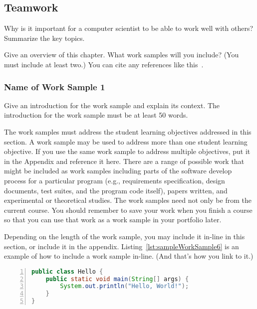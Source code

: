 \subsection{Teamwork}
Why is it important for a computer scientist to be able to work well with
others?  Summarize the key topics.

Give an overview of this chapter.  What work samples will you include?
(You must include at least two.)  You can cite any references like
this~\cite{parks:samsfsoal:2009}.

\subsubsection{Name of Work Sample 1}
Give an introduction for the work sample and explain its context.  The
introduction for the work sample must be at least 50 words.

The work samples must address the student learning objectives addressed in
this section.  A work sample may be used to address more than one student
learning objective.  If you use the same work sample to address multiple
objectives, put it in the Appendix and reference it here.
There are a range of possible work that might be
included as work samples including parts of the software develop process
for a particular program (e.g., requirements specification, design documents,
test suites, and the program code itself), papers written, and
experimental or theoretical studies.  The work samples need not only
be from the current course.  You should remember to save your work when
you finish a course so that you can use that work as a work sample in
your portfolio later.

Depending on the length of the work sample, you may include it in-line in
this section, or include it in the appendix.  Listing~\ref{lst:sampleWorkSample6}
is an example of how to include a work sample in-line. (And that's how you
link to it.)

\begin{singlespace}
\begin{lstlisting}[float,
                   escapeinside='',
                   basicstyle=\ttfamily\footnotesize,
                   emphstyle=\textbf,
                   numberstyle=\tiny,
                   xleftmargin=.3cm,
                   language=java,
                   numbers=left,
                   numbersep=5pt,
                   firstnumber=auto,
                   stepnumber=1,
                   numberblanklines=true,
                   showspaces=false,
                   showstringspaces=false,
                   showtabs=false,
                   captionpos=b,
                   caption=Sample Java Source File,
                   label=lst:sampleWorkSample6]
public class Hello {
    public static void main(String[] args) {
        System.out.println("Hello, World!");
    }
}
\end{lstlisting}
\end{singlespace}


